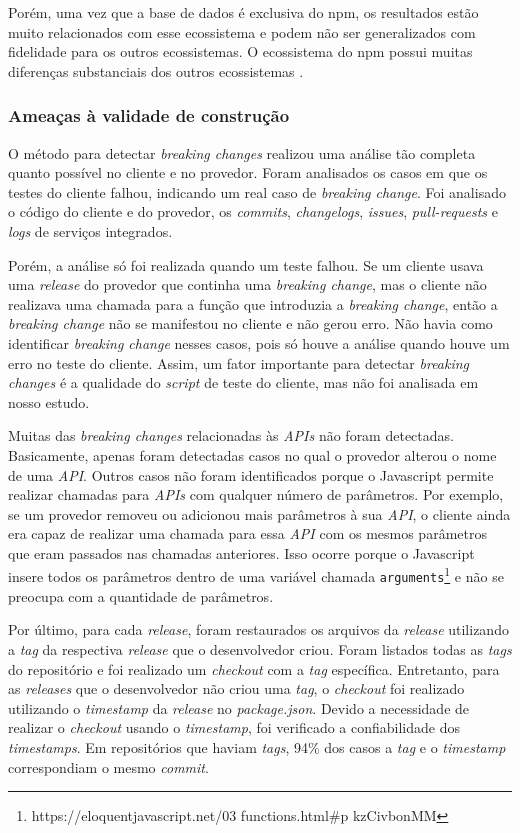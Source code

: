 Porém, uma vez que a base de dados é exclusiva do \textsf{npm}, os resultados estão muito relacionados com esse ecossistema e podem não ser generalizados com fidelidade para os outros ecossistemas. O ecossistema do \textsf{npm} possui muitas diferenças substanciais dos outros ecossistemas \cite{how_to_break_an_api}.

\subsubsection{Ameaças à validade de construção}
O método para detectar \textit{breaking changes} realizou uma análise tão completa quanto possível no cliente e no provedor. Foram analisados os casos em que os testes do cliente falhou, indicando um real caso de \textit{breaking change}. Foi analisado o código do cliente e do provedor, os \textit{commits}, \textit{changelogs}, \textit{issues}, \textit{pull-requests} e \textit{logs} de serviços integrados.

Porém, a análise só foi realizada quando um teste falhou. Se um cliente usava uma \textit{release} do provedor que continha uma \textit{breaking change}, mas o cliente não realizava uma chamada para a função que introduzia a \textit{breaking change}, então a \textit{breaking change} não se manifestou no cliente e não gerou erro. Não havia como identificar \textit{breaking change} nesses casos, pois só houve a análise quando houve um erro no teste do cliente. Assim, um fator importante para detectar \textit{breaking changes} é a qualidade do \textit{script} de teste do cliente, mas não foi analisada em nosso estudo.

Muitas das \textit{breaking changes} relacionadas às \textit{APIs} não foram detectadas. Basicamente, apenas foram detectadas casos no qual o provedor alterou o nome de uma \textit{API}. Outros casos não foram identificados porque o \textsf{Javascript} permite realizar chamadas para \textit{APIs} com qualquer número de parâmetros. Por exemplo, se um provedor removeu ou adicionou mais parâmetros à sua \textit{API}, o cliente ainda era capaz de realizar uma chamada para essa \textit{API} com os mesmos parâmetros que eram passados nas chamadas anteriores. Isso ocorre porque o \textsf{Javascript} insere todos os parâmetros dentro de uma variável chamada \texttt{arguments}\footnote{https://eloquentjavascript.net/03 functions.html\#p kzCivbonMM} e não se preocupa com a quantidade de parâmetros.

Por último, para cada \textit{release}, foram restaurados os arquivos da \textit{release} utilizando a \textit{tag} da respectiva \textit{release} que o desenvolvedor criou. Foram listados todas as \textit{tags} do repositório e foi realizado um \textit{checkout} com a \textit{tag} específica. Entretanto, para as \textit{releases} que o desenvolvedor não criou uma \textit{tag}, o \textit{checkout} foi realizado utilizando o \textit{timestamp} da \textit{release} no \textit{package.json}. Devido a necessidade de realizar o \textit{checkout} usando o \textit{timestamp}, foi verificado a confiabilidade dos \textit{timestamps}. Em repositórios que haviam \textit{tags}, 94\% dos casos a \textit{tag} e o \textit{timestamp} correspondiam o mesmo \textit{commit}.